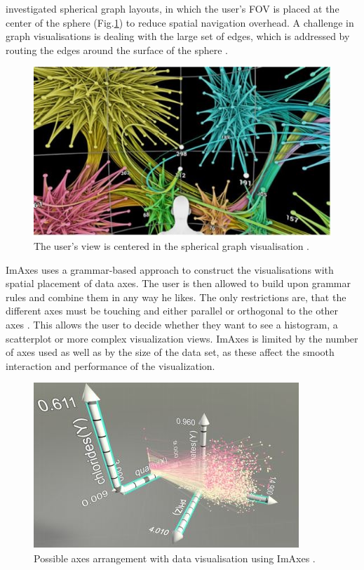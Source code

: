 \newline\cite[]{Kwon2016} investigated spherical graph layouts, in which the user's \ac{FOV} is placed at the center of the sphere (Fig.\ref{figure:SpericalGraphCenteredView}) to reduce spatial navigation overhead. A challenge in graph visualisations is dealing with the large set of edges, which is addressed by routing the edges around the surface of the sphere \autocite[1803]{Kwon2016}.
\begin{figure}[!ht]
    \centering
	\includegraphics[width=0.49 \textwidth]{images/Kwon2016_sphericalgraphlayout_centereduser.jpg}
	\caption{
		The user's view is centered in the spherical graph visualisation  \autocite{Kwon2016}.
	}
	\label{figure:SpericalGraphCenteredView}
\end{figure}
ImAxes uses a grammar-based approach to construct the visualisations with spatial placement of data axes. The user is then allowed to build upon grammar rules and combine them in any way he likes. The only restrictions are, that the different axes must be touching and either parallel or orthogonal to the other axes \autocite[]{Cordeil2017a}. This allows the user to decide whether they want to see a histogram, a scatterplot or more complex visualization views. ImAxes is limited by the number of axes used as well as by the size of the data set, as these affect the smooth interaction and performance of the visualization.
\begin{figure}[!ht]
    \centering
	\includegraphics[width=0.49 \textwidth]{images/Cordeil_ImAxes.jpg}
	\caption{
		Possible axes arrangement with data visualisation using ImAxes \autocite{Cordeil2017a}.
	}
	\label{figure:ImAxes}
\end{figure}
